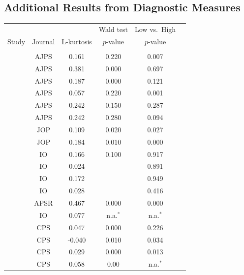 \documentclass[12pt]{article}
\begin{document}
\clearpage

\subsection{Additional Results from Diagnostic Measures}
 \vspace{-1em}
 \begin{table}[!ht]
  \centering\footnotesize
  \begin{tabular}{lccccc}
    \hline\hline
    &  & & Wald test  & Low vs.\ High   \\ 
    \multicolumn{1}{c}{Study} & Journal & L-kurtosis  & $p$-value &  $p$-value  \\ 
    \hline\\
      \citet{Adams2006}  & AJPS & 0.161 & 0.220 & 0.007 \\ 
     \citet{Aklin2013}  & AJPS & 0.381 & 0.000 & 0.697 \\ 
       \citet{Aklin2013}   & AJPS & 0.187 & 0.000 & 0.121 \\ 
       \citet{Banks2012}    & AJPS & 0.057 & 0.220 & 0.001 \\ 
       \citet{Banks2012}    & AJPS & 0.242 & 0.150 & 0.287 \\ 
      \citet{Banks2012}    & AJPS & 0.242 & 0.280 & 0.094 \\ 
      \citet{Bodea2015_JOP}   & JOP & 0.109 & 0.020 & 0.027 \\ 
   \citet{Bodea2015_JOP}   & JOP & 0.184 & 0.010 & 0.000 \\ 
      \citet{Bodea2015_IO}  & IO & 0.166 & 0.100 & 0.917 \\ 
       \citet{Bodea2015_IO}  & IO & 0.024 &  & 0.891 \\ 
       \citet{Bodea2015_IO}  & IO & 0.172 &  & 0.949 \\ 
       \citet{Bodea2015_IO} & IO & 0.028 &  & 0.416 \\ 
    \citet{Carpenter2014}   & APSR & 0.467 & 0.000 & 0.000 \\ 
    \citet{chapman2009audience} & IO & 0.077 & n.a.$^{*}$  & n.a.$^{*}$ \\ 
      \citet{clark2006rehabilitating}    & CPS & 0.047 & 0.000 & 0.226 \\ 
      \citet{clark2006rehabilitating}  & CPS & -0.040 & 0.010 & 0.034 \\ 
     \citet{clark2006rehabilitating}   & CPS & 0.029 & 0.000 & 0.013 \\ 
    \citet{clark2006rehabilitating}    & CPS & 0.058 & 0.00 & n.a.$^{*}$ \\ 

\end{tabular}
\end{table}
\end{document}
